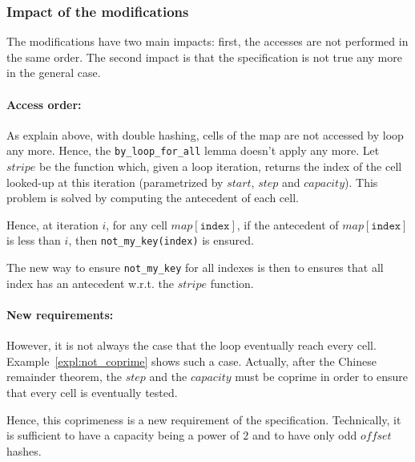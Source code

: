 \documentclass[oneside]{article}
\begin{document}
\subsubsection{Impact of the modifications}

The modifications have two main impacts: first, the accesses are not performed in the same order. The second impact is that the specification is not true any more in the general case.

\paragraph{Access order:}
As explain above, with double hashing, cells of the map are not accessed by loop any more. Hence, the \texttt{by\_loop\_for\_all} lemma doesn't apply any more. Let $stripe$ be the function which, given a loop iteration, returns the index of the cell looked-up at this iteration (parametrized by $start$, $step$ and $capacity$). This problem is solved by computing the antecedent of each cell. 

Hence, at iteration $i$, for any cell $map[\mathtt{index}]$, if the antecedent of $map[\mathtt{index}]$ is less than $i$, then \texttt{not\_my\_key(index)} is ensured.

The new way to ensure \texttt{not\_my\_key} for all indexes is then to ensures that all index has an antecedent w.r.t. the $stripe$ function.

\paragraph{New requirements:}
However, it is not always the case that the loop eventually reach every cell. Example~\ref{expl:not_coprime} shows such a case. Actually, after the Chinese remainder theorem, the $step$ and the $capacity$ must be coprime in order to ensure that every cell is eventually tested.

Hence, this coprimeness is a new requirement of the specification. Technically, it is sufficient to have a capacity being a power of $2$ and to have only odd $offset$ hashes.
\end{document}
